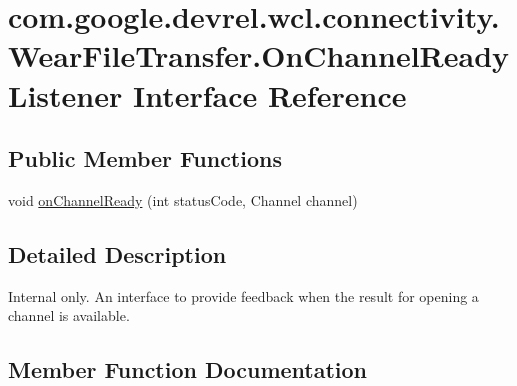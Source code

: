 \hypertarget{interfacecom_1_1google_1_1devrel_1_1wcl_1_1connectivity_1_1WearFileTransfer_1_1OnChannelReadyListener}{}\section{com.\+google.\+devrel.\+wcl.\+connectivity.\+Wear\+File\+Transfer.\+On\+Channel\+Ready\+Listener Interface Reference}
\label{interfacecom_1_1google_1_1devrel_1_1wcl_1_1connectivity_1_1WearFileTransfer_1_1OnChannelReadyListener}
\subsection*{Public Member Functions}
\begin{DoxyCompactItemize}
\item 
void \hyperlink{interfacecom_1_1google_1_1devrel_1_1wcl_1_1connectivity_1_1WearFileTransfer_1_1OnChannelReadyListener_a61ab5aba56b7d2a25abdc3567b485ddc}{on\+Channel\+Ready} (int status\+Code, Channel channel)
\end{DoxyCompactItemize}


\subsection{Detailed Description}
Internal only. An interface to provide feedback when the result for opening a channel is available. 

\subsection{Member Function Documentation}
